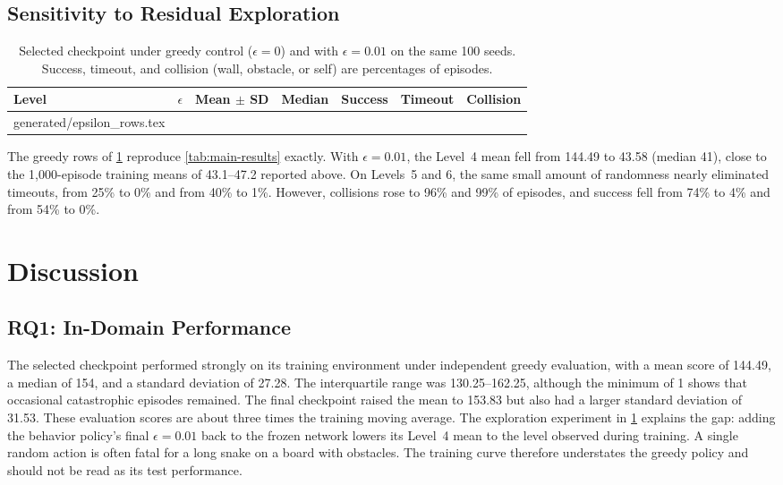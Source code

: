 \documentclass[journal]{IEEEtran}
\makeatletter
\newcommand{\tablerows}[1]{\@@input #1 }
\makeatother
\begin{document}
\subsection{Sensitivity to Residual Exploration}

\begin{table}[t]
  \centering
  \caption{Selected checkpoint under greedy control ($\epsilon=0$) and with
  $\epsilon=0.01$ on the same 100 seeds. Success, timeout, and collision
  (wall, obstacle, or self) are percentages of episodes.}
  \label{tab:epsilon}
  \setlength{\tabcolsep}{3.5pt}
  \begin{tabular}{lrrrrrr}
    \toprule
    Level & $\epsilon$ & Mean $\pm$ SD & Median & Success & Timeout & Collision \\
    \midrule
\tablerows{generated/epsilon_rows.tex}
    \bottomrule
  \end{tabular}
\end{table}

The greedy rows of \cref{tab:epsilon} reproduce \cref{tab:main-results}
exactly. With $\epsilon=0.01$, the Level~4 mean fell from 144.49 to 43.58
(median 41), close to the 1,000-episode training means of 43.1--47.2 reported
above. On Levels~5 and 6, the same small amount of randomness nearly eliminated
timeouts, from 25\% to 0\% and from 40\% to 1\%. However, collisions rose to
96\% and 99\% of episodes, and success fell from 74\% to 4\% and from 54\% to
0\%.

\section{Discussion}
\label{sec:discussion}

\subsection{RQ1: In-Domain Performance}

The selected checkpoint performed strongly on its training environment under
independent greedy evaluation, with a mean score of 144.49, a median of 154,
and a standard deviation of 27.28. The interquartile range was 130.25--162.25,
although the minimum of 1 shows that occasional catastrophic episodes remained.
The final checkpoint raised the mean to 153.83 but also had a larger standard
deviation of 31.53. These evaluation scores are about three times the training
moving average. The exploration experiment in \cref{tab:epsilon} explains the
gap: adding the behavior policy's final $\epsilon=0.01$ back to the frozen
network lowers its Level~4 mean to the level observed during training. A single
random action is often fatal for a long snake on a board with obstacles. The
training curve therefore understates the greedy policy and should not be read
as its test performance.
\end{document}
